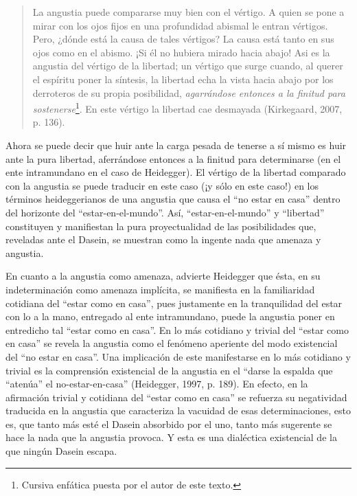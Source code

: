\begin{refsection}
\begin{quote}
La angustia puede compararse muy bien con el vértigo. A quien se pone a mirar con los ojos fijos en una profundidad abismal le entran vértigos. Pero, ¿dónde está la causa de tales vértigos? La causa está tanto en sus ojos como en el abismo. ¡Si él no hubiera mirado hacia abajo! Asi es la angustia del vértigo de la libertad; un vértigo que surge cuando, al querer el espíritu poner la síntesis, la libertad echa la vista hacia abajo por los derroteros de su propia posibilidad, \emph{agarrándose entonces a la finitud para sostenerse}\footnote{Cursiva enfática puesta por el autor de este texto.}. En este vértigo la libertad cae desmayada (Kirkegaard, 2007, p. 136).
\end{quote}

Ahora se puede decir que huir ante la carga pesada de tenerse a sí mismo es huir ante la pura libertad, aferrándose entonces a la finitud para determinarse (en el ente intramundano en el caso de Heidegger). El vértigo de la libertad comparado con la angustia se puede traducir en este caso (¡y sólo en este caso!) en los términos heideggerianos de una angustia que causa el ``no estar en casa'' dentro del horizonte del ``estar-en-el-mundo''. Así, ``estar-en-el-mundo'' y ``libertad'' constituyen y manifiestan la pura proyectualidad de las posibilidades que, reveladas ante el Dasein, se muestran como la ingente nada que amenaza y angustia.

En cuanto a la angustia como amenaza, advierte Heidegger que ésta, en su indeterminación como amenaza implícita, se manifiesta en la familiaridad cotidiana del ``estar como en casa'', pues justamente en la tranquilidad del estar con lo a la mano, entregado al ente intramundano, puede la angustia poner en entredicho tal ``estar como en casa''. En lo más cotidiano y trivial del ``estar como en casa'' se revela la angustia como el fenómeno aperiente del modo existencial del ``no estar en casa''. Una implicación de este manifestarse en lo más cotidiano y trivial es la comprensión existencial de la angustia en el ``darse la espalda que ``atenúa'' el no-estar-en-casa'' (Heidegger, 1997, p. 189). En efecto, en la afirmación trivial y cotidiana del ``estar como en casa'' se refuerza su negatividad traducida en la angustia que caracteriza la vacuidad de esas determinaciones, esto es, que tanto más esté el Dasein absorbido por el uno, tanto más sugerente se hace la nada que la angustia provoca. Y esta es una dialéctica existencial de la que ningún Dasein escapa.


\end{refsection}

